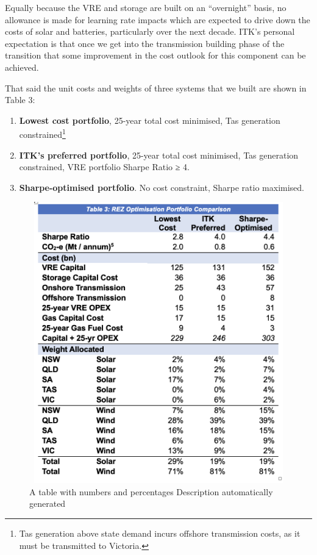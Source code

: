 \documentclass[
  letterpaper,
  DIV=11,
  numbers=noendperiod]{scrartcl}
\begin{document}
Equally because the VRE and storage are built on an ``overnight'' basis,
no allowance is made for learning rate impacts which are expected to
drive down the costs of solar and batteries, particularly over the next
decade. ITK's personal expectation is that once we get into the
transmission building phase of the transition that some improvement in
the cost outlook for this component can be achieved.

That said the unit costs and weights of three systems that we built are
shown in Table 3:

\begin{enumerate}
\def\labelenumi{\arabic{enumi}.}
\item
  \textbf{Lowest cost portfolio}, 25-year total cost minimised, Tas
  generation constrained\footnote{Tas generation above state demand
    incurs offshore transmission costs, as it must be transmitted to
    Victoria.}
\item
  \textbf{ITK's preferred portfolio}, 25-year total cost minimised, Tas
  generation constrained, VRE portfolio Sharpe Ratio ≥ 4.
\item
  \textbf{Sharpe-optimised portfolio}. No cost constraint, Sharpe ratio
  maximised.
\end{enumerate}

\begin{figure}[H]

{\centering \includegraphics[width=6in,height=4.8in]{./media/media/image17.png}

}

\caption{A table with numbers and percentages Description automatically
generated}

\end{figure}%
\end{document}
